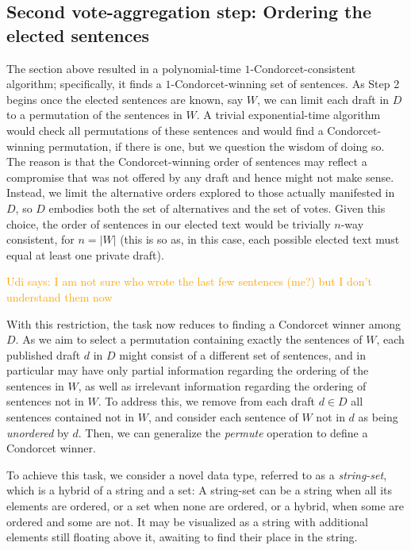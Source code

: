 \documentclass[sigconf]{aamas}  %
\newcommand{\udi}[1]{\textcolor{orange}{Udi says: #1}}
\begin{document}
\subsection{Second vote-aggregation step: Ordering the elected sentences}

The section above resulted in a polynomial-time $1$-Condorcet-consistent algorithm; specifically, it finds a $1$-Condorcet-winning set of sentences.
As Step 2 begins once the elected sentences are known, say $W$, we can limit each draft in $D$ to a permutation of the sentences in $W$.
A trivial exponential-time algorithm would check all permutations of these sentences and would find a Condorcet-winning permutation, if there is one, but we question the wisdom of doing so. The reason is that the Condorcet-winning order of sentences may reflect a compromise that was not offered by any draft and hence might not make sense.
Instead, we limit the alternative orders explored to those actually manifested in $D$, so $D$ embodies both the set of alternatives and the set of votes. Given this choice, the order of sentences in our elected text would be trivially $n$-way consistent, for $n = |W|$
(this is so as, in this case, each possible elected text must equal at least one private draft).

\udi{I am not sure who wrote the last few sentences (me?) but I don't understand them now}

With this restriction, the task now reduces to finding a Condorcet winner among $D$. As we aim to select a permutation containing exactly the sentences of $W$,
each published draft $d$ in $D$ might consist of a different set of sentences, and in particular may have only partial information regarding the ordering of the sentences in $W$, as well as irrelevant information regarding the ordering of sentences not in $W$.  To address this, we remove from each draft $d \in D$ all sentences contained not in $W$, and consider each sentence of $W$ not in $d$ as being \emph{unordered} by $d$.  Then, we can generalize the \emph{permute} operation to define a Condorcet winner.

To achieve this task, we consider a novel data type, referred to as a \emph{string-set}, which is a hybrid of a string and a set:
  A string-set can be a string when all its elements are ordered,
  or a set when none are ordered,
  or a hybrid, when some are ordered and some are not.
It may be visualized as a string with additional elements still floating above it, awaiting to find their place in the string.
\end{document}
